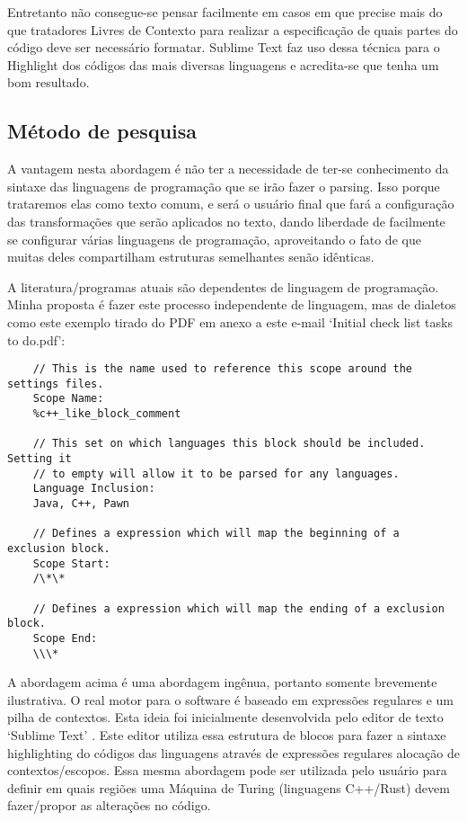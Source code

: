 \begin{englishtext}
    Entretanto não consegue-se pensar facilmente em casos em que precise mais do que tratadores
    Livres de Contexto para realizar a especificação de quais partes do código deve ser necessário
    formatar. Sublime Text faz uso dessa técnica para o Highlight dos códigos das mais diversas
    linguagens e acredita-se que tenha um bom resultado.


\subsection{Método de pesquisa}

    A vantagem nesta abordagem é não ter a necessidade de ter-se conhecimento da sintaxe das
    linguagens de programação que se irão fazer o parsing. Isso porque trataremos elas como texto
    comum, e será o usuário final que fará a configuração das transformações que serão aplicados no
    texto, dando liberdade de facilmente se configurar várias linguagens de programação,
    aproveitando o fato de que muitas deles compartilham estruturas semelhantes senão idênticas.

    A literatura/programas atuais são dependentes de linguagem de programação. Minha proposta é
    fazer este processo independente de linguagem, mas de dialetos como este exemplo tirado do PDF
    em anexo a este e-mail `Initial check list tasks to do.pdf':

    \begin{lstlisting}
    // This is the name used to reference this scope around the settings files.
    Scope Name:
    %c++_like_block_comment

    // This set on which languages this block should be included. Setting it
    // to empty will allow it to be parsed for any languages.
    Language Inclusion:
    Java, C++, Pawn

    // Defines a expression which will map the beginning of a exclusion block.
    Scope Start:
    /\*\*

    // Defines a expression which will map the ending of a exclusion block.
    Scope End:
    \\\*
    \end{lstlisting}
    \vspace*{-4mm}

    A abordagem acima é uma abordagem ingênua, portanto somente brevemente ilustrativa. O real motor
    para o software é baseado em expressões regulares e um pilha de contextos. Esta ideia foi
    inicialmente desenvolvida pelo editor de texto `Sublime Text' \cite{Skinner}. Este editor
    utiliza essa estrutura de blocos para fazer a sintaxe highlighting do códigos das linguagens
    através de expressões regulares alocação de contextos/escopos. Essa mesma abordagem pode ser
    utilizada pelo usuário para definir em quais regiões uma Máquina de Turing (linguagens C++/Rust)
    devem fazer/propor as alterações no código.



\end{englishtext}
